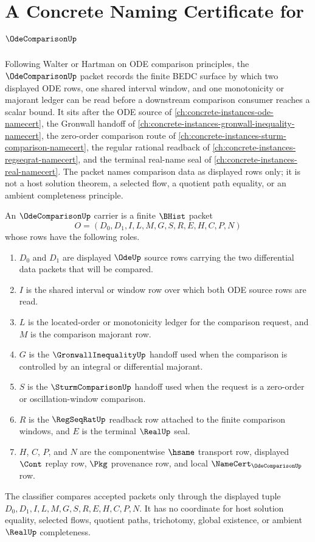 \chapter{A Concrete Naming Certificate for $\OdeComparisonUp$}
\label{ch:concrete-instances-ode-comparison-namecert}

Following Walter or Hartman on ODE comparison principles, the $\OdeComparisonUp$ packet records the finite BEDC surface by which two displayed ODE rows, one shared interval window, and one monotonicity or majorant ledger can be read before a downstream comparison consumer reaches a scalar bound. It sits after the ODE source of \autoref{ch:concrete-instances-ode-namecert}, the Gronwall handoff of \autoref{ch:concrete-instances-gronwall-inequality-namecert}, the zero-order comparison route of \autoref{ch:concrete-instances-sturm-comparison-namecert}, the regular rational readback of \autoref{ch:concrete-instances-regseqrat-namecert}, and the terminal real-name seal of \autoref{ch:concrete-instances-real-namecert}. The packet names comparison data as displayed rows only; it is not a host solution theorem, a selected flow, a quotient path equality, or an ambient completeness principle.

\begin{definition}
\label{def:ode-comparison-carrier}
An $\OdeComparisonUp$ carrier is a finite $\BHist$ packet
$$
O=(D_0,D_1,I,L,M,G,S,R,E,H,C,P,N)
$$
whose rows have the following roles.
\begin{enumerate}
\item $D_0$ and $D_1$ are displayed $\OdeUp$ source rows carrying the two differential data packets that will be compared.
\item $I$ is the shared interval or window row over which both ODE source rows are read.
\item $L$ is the located-order or monotonicity ledger for the comparison request, and $M$ is the comparison majorant row.
\item $G$ is the $\GronwallInequalityUp$ handoff used when the comparison is controlled by an integral or differential majorant.
\item $S$ is the $\SturmComparisonUp$ handoff used when the request is a zero-order or oscillation-window comparison.
\item $R$ is the $\RegSeqRatUp$ readback row attached to the finite comparison windows, and $E$ is the terminal $\RealUp$ seal.
\item $H$, $C$, $P$, and $N$ are the componentwise $\hsame$ transport row, displayed $\Cont$ replay row, $\Pkg$ provenance row, and local $\NameCert_{\OdeComparisonUp}$ row.
\end{enumerate}
The classifier compares accepted packets only through the displayed tuple $D_0,D_1,I,L,M,G,S,R,E,H,C,P,N$. It has no coordinate for host solution equality, selected flows, quotient paths, trichotomy, global existence, or ambient $\RealUp$ completeness.
\end{definition}

